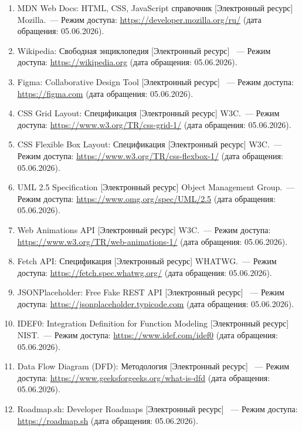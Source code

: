 \begin{enumerate}
    \item MDN Web Docs: HTML, CSS, JavaScript справочник [Электронный ресурс] Mozilla.~--- Режим доступа: \url{https://developer.mozilla.org/ru/} (дата обращения: 05.06.2026).
    \item Wikipedia: Свободная энциклопедия [Электронный ресурс] ~--- Режим доступа: \url{https://wikipedia.org} (дата обращения: 05.06.2026).
    \item Figma: Collaborative Design Tool [Электронный ресурс] ~--- Режим доступа: \url{https://figma.com} (дата обращения: 05.06.2026).
    \item CSS Grid Layout: Спецификация [Электронный ресурс] W3C.~--- Режим доступа: \url{https://www.w3.org/TR/css-grid-1/} (дата обращения: 05.06.2026).
    \item CSS Flexible Box Layout: Спецификация [Электронный ресурс] W3C.~--- Режим доступа: \url{https://www.w3.org/TR/css-flexbox-1/} (дата обращения: 05.06.2026).
    \item UML 2.5 Specification [Электронный ресурс] Object Management Group.~--- Режим доступа: \url{https://www.omg.org/spec/UML/2.5} (дата обращения: 05.06.2026).
    \item Web Animations API [Электронный ресурс] W3C.~--- Режим доступа: \url{https://www.w3.org/TR/web-animations-1/} (дата обращения: 05.06.2026).
    \item Fetch API: Спецификация [Электронный ресурс] WHATWG.~--- Режим доступа: \url{https://fetch.spec.whatwg.org/} (дата обращения: 05.06.2026).
    \item JSONPlaceholder: Free Fake REST API [Электронный ресурс] ~--- Режим доступа: \url{https://jsonplaceholder.typicode.com} (дата обращения: 05.06.2026).
    \item IDEF0: Integration Definition for Function Modeling [Электронный ресурс] NIST.~--- Режим доступа: \url{https://www.idef.com/idef0} (дата обращения: 05.06.2026).
    \item Data Flow Diagram (DFD): Методология [Электронный ресурс] ~--- Режим доступа: \url{https://www.geeksforgeeks.org/what-is-dfd} (дата обращения: 05.06.2026).
    \item Roadmap.sh: Developer Roadmaps [Электронный ресурс] ~--- Режим доступа: \url{https://roadmap.sh} (дата обращения: 05.06.2026).
\end{enumerate}

\newpage
